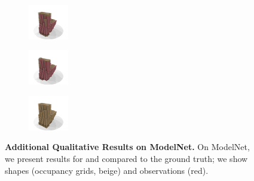 \begin{figure}[t!]
\begin{subfigure}[t]{0.1\textwidth}
        \includegraphics[width=1.75cm,trim={0.5cm 0cm 0.375cm 0.5cm},clip]{gfx/appendix_experiments_modelnet/vae_occ_aml/toilet.clean.25.small.weighted/binvox_points/00016}
    \end{subfigure}
    \begin{subfigure}[t]{0.1\textwidth}
        \vspace{0px}
        \centering
        \includegraphics[width=1.75cm,trim={0.5cm 0cm 0.375cm 0.5cm},clip]{gfx/appendix_experiments_modelnet/vae_occ_sup/toilet.clean.25.small.weighted/binvox_points/00016}
    \end{subfigure}
    \begin{subfigure}[t]{0.1\textwidth}
        \vspace{0px}
        \centering
        \includegraphics[width=1.75cm,trim={0.5cm 0cm 0.375cm 0.5cm},clip]{gfx/appendix_experiments_modelnet/vae_occ_aml/toilet.clean.25.small.weighted/target/00016}
    \end{subfigure}
    \caption{{\bf Additional Qualitative Results on ModelNet.} On ModelNet, we present results for \AML and \Sup compared to the ground truth; we show shapes (occupancy grids, {\color{rbeige}beige}) and observations ({\color{red}red}).}
    \label{fig:appendix-experiments-modelnet}
    \vspace*{-0.25cm}
\end{figure}